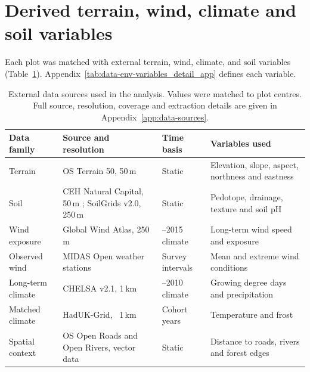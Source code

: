 \section{Derived terrain, wind, climate and soil variables}
\label{sec:data-environmental}

Each plot was matched with external terrain, wind, climate, and soil variables (Table~\ref{tab:data-env-sources}). Appendix~\ref{tab:data-env-variables_detail_app} defines each variable.

\begin{table}[!htbp]
\centering
\scriptsize
\setlength{\tabcolsep}{4pt}
\renewcommand{\arraystretch}{1.05}
\begin{tabular}{ >{\raggedright\arraybackslash}p{2.0cm} >{\raggedright\arraybackslash}p{4.2cm} >{\raggedright\arraybackslash}p{2.3cm} >{\raggedright\arraybackslash}p{4.0cm}}
\hline
Data family & Source and resolution & Time basis & Variables used \\
\hline
Terrain & OS Terrain 50, 50\,m \cite{ordnancesurveyTerrain50_C3_LID} & Static & Elevation, slope, aspect, northness and eastness \\

Soil & CEH Natural Capital, 50\,m \cite{feeney2026CEHNaturalCapital_C3_LID}; SoilGrids v2.0, 250\,m \cite{poggio2021SoilGrids_C3_LID} & Static & Pedotope, drainage, texture and soil pH \\

Wind exposure & Global Wind Atlas, 250\,m \cite{davis2023GlobalWindAtlas_C3_LID} & 2006--2015 climate & Long-term wind speed and exposure \\

Observed wind & MIDAS Open weather stations \cite{metoffice2019MIDASOpen_C3_LID} & Survey intervals & Mean and extreme wind conditions \\

Long-term climate & CHELSA v2.1, 1\,km \cite{karger2017CHELSA_C3_LID} & 1981--2010 climate & Growing degree days and precipitation \\

Matched climate & HadUK-Grid, ~1\,km \cite{hollis2019HadUKGrid_C3_LID} & Cohort years & Temperature and frost \\

Spatial context & OS Open Roads and Open Rivers, vector data
\cite{ordnancesurveyOpenRoads_C3_LID,ordnancesurveyOpenRivers_C3_LID} & Static & Distance to roads, rivers and forest edges \\
\hline
\end{tabular}

\caption{\small{External data sources used in the analysis. Values were matched to plot centres. Full source, resolution, coverage and extraction details are given in Appendix~\ref{app:data-sources}.}}
\label{tab:data-env-sources}
\end{table}

